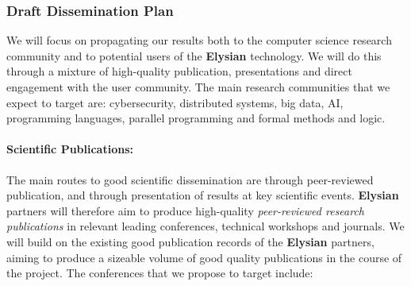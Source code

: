 \documentclass[a4paper,11pt]{article}
\newcommand{\project}[1]{\textbf{#1}\xspace}
\newcommand{\SECURITY}{\project{Elysian}}
\newcommand{\TheProject}{\SECURITY}
\begin{document}
\subsubsection{Draft Dissemination Plan}

We will focus on propagating our results both to the computer science
research community and to potential users of the \TheProject{} technology.
We will do this through a mixture of high-quality publication, presentations
and direct engagement with the user community.
%
The main research communities that we expect to target are:
cybersecurity, distributed systems, big data, AI, programming languages, parallel programming and formal methods and logic. 
% 

\paragraph{Scientific Publications:}  The main routes to good scientific dissemination are
through peer-reviewed publication, and through presentation of results at key scientific events.
\TheProject{} partners will therefore aim to produce high-quality \emph{peer-reviewed
research publications} in relevant leading
conferences, technical workshops and journals.
We will build on the existing good publication records of the \TheProject{} partners,
aiming to produce a sizeable volume of good quality publications in the course of the project. 
%
\noindent
The conferences that we propose to target include:
\end{document}
